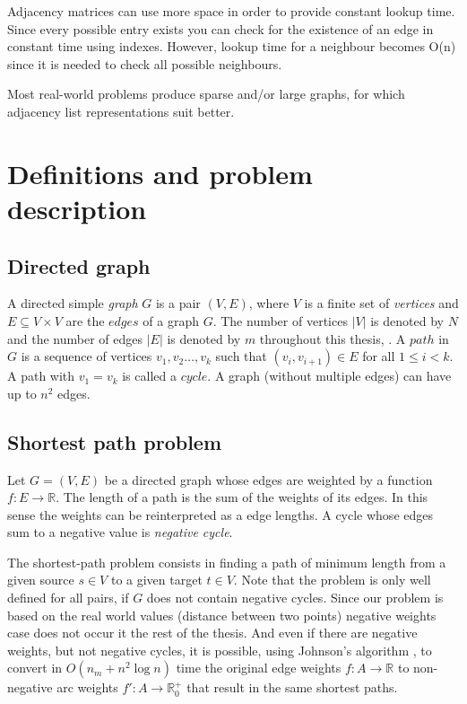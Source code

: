 \documentclass[thesis=M,english]{FITthesis}[2012/10/20]
\begin{document}
Adjacency matrices can use more space in order to provide constant lookup time. Since every possible entry exists you can check for the existence of an edge in constant time using indexes. However, lookup time for a neighbour becomes O(n) since it is needed to check all possible neighbours.

Most real-world problems produce sparse and/or large graphs, for which adjacency list representations suit better.

\section{Definitions and problem description}

\subsection{Directed graph}
A directed simple \textit{graph} $G$ is a pair $(V, E)$, where $V$ is a finite set of \textit{vertices} and $E \subseteq V \times V$ are the $edges$ of a graph $G$. The number of vertices $|V|$ is denoted by $N$ and the number of edges $|E|$ is denoted by $m$ throughout this thesis, . A $path$ in $G$ is a sequence of vertices $v_1, v_2 \dots ,v_k$ such that $(v_i,v_{i+1}) \in E$ for all $1 \leq i < k$. A path with $v_1 = v_k$ is called a $cycle$. A graph (without multiple edges) can have up to $n^2$ edges. 


\subsection{Shortest path problem}
Let $G = (V, E)$ be a directed graph whose edges are weighted by a function $f: E \to \mathbb{R}$. 
The length of a path is the sum of the weights of its edges. In this sense the weights can be reinterpreted as a edge lengths. A cycle whose edges sum to a negative value is \textit{negative cycle}.  

The shortest-path problem consists in finding a path of minimum length from a given source $s \in V$ to a given target $t \in V$.
Note that the problem is only well defined for all pairs, if $G$ does not contain negative cycles.
Since our problem is based on the real world values (distance between two points) negative weights case does not occur it the rest of the thesis.
And even if there are negative weights, but not negative cycles, it is possible, using Johnson's algorithm \cite{Johnson77}, to convert in $O(n_m + n^2 \log n)$ time the original edge weights $f: A \to \mathbb{R}$ to non-negative arc weights $ f': A \to \mathbb{R}^+_0$ that result in the same shortest paths.
\end{document}
